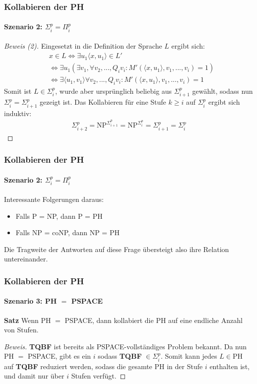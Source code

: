 \begin{frame}
    \frametitle{Kollabieren der PH}
    \framesubtitle{Szenario 2: $\Sigma^p_i = \Pi^p_i$}
    
    \begin{proof}[Beweis (2)]
         Eingesetzt in die Definition der Sprache $L$ ergibt sich:
         \small
        \begin{align*}
        & x \in L \Leftrightarrow \exists u_1 \langle x, u_1 \rangle \in L' \\
        & \Leftrightarrow \exists u_1 (\exists v_1, \forall v_2, ..., Q_i v_i :  M'(\langle x, u_1 \rangle, v_1, ..., v_i) = 1) \\
        & \Leftrightarrow \exists \langle u_1, v_1 \rangle \forall v_2, ..., Q_i v_i : M'(\langle x, u_1 \rangle, v_1, ..., v_i) = 1
        \end{align*}
        Somit ist $L \in \Sigma^p_i$, wurde aber ursprünglich beliebig aus $\Sigma^p_{i+1}$ gewählt, sodass nun $\Sigma^p_i = \Sigma^p_{i+1}$ gezeigt ist. Das Kollabieren für eine Stufe $k \geq i$ auf $\Sigma^p_i$ ergibt sich induktiv:
        \begin{align*}
        \Sigma^p_{i+2} = \text{NP}^{\Sigma^p_{i+1}} = \text{NP}^{\Sigma^p_i} = \Sigma^p_{i+1} = \Sigma^p_i
        \end{align*}
    \end{proof}
\end{frame}


\begin{frame}
    \frametitle{Kollabieren der PH}
    \framesubtitle{Szenario 2: $\Sigma^p_i = \Pi^p_i$}
    Interessante Folgerungen daraus:
    \begin{itemize}
        \item Falls P = NP, dann P = PH
        \item Falls NP = coNP, dann NP = PH
    \end{itemize}
    Die Tragweite der Antworten auf diese Frage übersteigt also ihre Relation untereinander.
\end{frame}


\begin{frame}
    \frametitle{Kollabieren der PH}
    \framesubtitle{Szenario 3: PH $=$ PSPACE}
     \begin{block}{\textbf{Satz}}
        Wenn PH $=$ PSPACE, dann kollabiert die PH auf eine endliche Anzahl von Stufen. 
    \end{block}
    
    \begin{proof}[Beweis]
        \textbf{TQBF} ist bereits als PSPACE-vollständiges Problem bekannt. Da nun PH $=$ PSPACE, gibt es ein $i$ sodass \textbf{TQBF} $\in \Sigma^p_i$. Somit kann jedes $L \in \text{PH}$ auf \textbf{TQBF} reduziert werden, sodass die gesamte PH in der Stufe $i$ enthalten ist, und damit nur über $i$ Stufen verfügt.
    \end{proof}
\end{frame}


